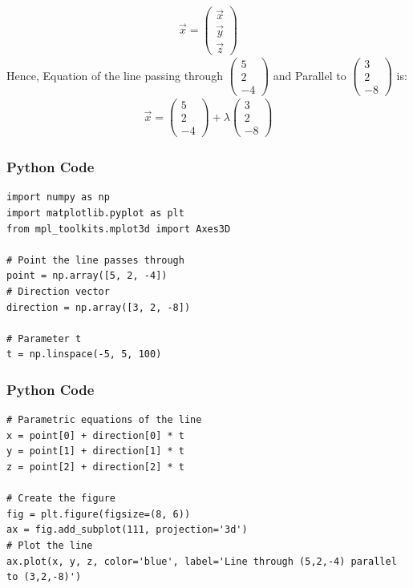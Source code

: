 \documentclass{beamer}
\begin{document}
\begin{frame}
\begin{align}
\vec{x}= \begin{pmatrix}\vec{x} \\\vec{y} \\\vec{z}\end{pmatrix}
\end{align}
Hence, Equation of the line passing through $\begin{pmatrix}5 \\2 \\-4\end{pmatrix}$ and Parallel to $\begin{pmatrix}3 \\2 \\-8\end{pmatrix}$ is:\\
\begin{align*}
\vec{x} = \begin{pmatrix}5 \\2 \\-4\end{pmatrix} + \lambda \begin{pmatrix}3 \\2 \\-8\end{pmatrix}
\end{align*}
\end{frame}

\begin{frame}[fragile]
    \frametitle{Python Code}
    \begin{lstlisting}
import numpy as np
import matplotlib.pyplot as plt
from mpl_toolkits.mplot3d import Axes3D

# Point the line passes through
point = np.array([5, 2, -4])
# Direction vector
direction = np.array([3, 2, -8])

# Parameter t
t = np.linspace(-5, 5, 100)
\end{lstlisting}
\end{frame}

\begin{frame}[fragile]
\frametitle{Python Code}
\begin{lstlisting}
# Parametric equations of the line
x = point[0] + direction[0] * t
y = point[1] + direction[1] * t
z = point[2] + direction[2] * t

# Create the figure
fig = plt.figure(figsize=(8, 6))
ax = fig.add_subplot(111, projection='3d')
# Plot the line
ax.plot(x, y, z, color='blue', label='Line through (5,2,-4) parallel to (3,2,-8)')
    \end{lstlisting}
\end{frame}
\end{document}
